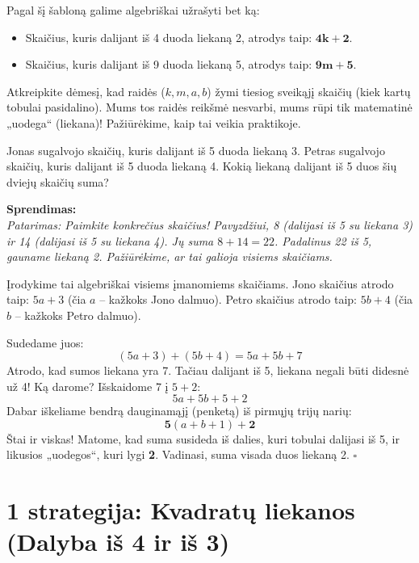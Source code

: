 \documentclass[11pt,a4paper]{scrartcl}
\newenvironment{solution}
    {\begin{list}{}{\setlength{\leftmargin}{10pt}\setlength{\rightmargin}{10pt}}\item[]}
    {\end{list}}
\begin{document}
Pagal šį šabloną galime algebriškai užrašyti bet ką:
\begin{itemize}
    \item Skaičius, kuris dalijant iš 4 duoda liekaną 2, atrodys taip: $\mathbf{4k + 2}$.
    \item Skaičius, kuris dalijant iš 9 duoda liekaną 5, atrodys taip: $\mathbf{9m + 5}$.
\end{itemize}
Atkreipkite dėmesį, kad raidės ($k, m, a, b$) žymi tiesiog sveikąjį skaičių (kiek kartų tobulai pasidalino). Mums tos raidės reikšmė nesvarbi, mums rūpi tik matematinė „uodega“ (liekana)! Pažiūrėkime, kaip tai veikia praktikoje.

\begin{example}
Jonas sugalvojo skaičių, kuris dalijant iš 5 duoda liekaną 3. Petras sugalvojo skaičių, kuris dalijant iš 5 duoda liekaną 4. Kokią liekaną dalijant iš 5 duos šių dviejų skaičių suma?
\end{example}

\begin{solution}
\textbf{Sprendimas:} \\
\textit{Patarimas: Paimkite konkrečius skaičius! Pavyzdžiui, 8 (dalijasi iš 5 su liekana 3) ir 14 (dalijasi iš 5 su liekana 4). Jų suma $8 + 14 = 22$. Padalinus 22 iš 5, gauname liekaną 2. Pažiūrėkime, ar tai galioja visiems skaičiams.}

Įrodykime tai algebriškai visiems įmanomiems skaičiams.
Jono skaičius atrodo taip: $5a + 3$ (čia $a$ – kažkoks Jono dalmuo).
Petro skaičius atrodo taip: $5b + 4$ (čia $b$ – kažkoks Petro dalmuo).

Sudedame juos:
\[ (5a + 3) + (5b + 4) = 5a + 5b + 7 \]
Atrodo, kad sumos liekana yra 7. Tačiau dalijant iš 5, liekana negali būti didesnė už 4! Ką darome? Išskaidome 7 į $5 + 2$:
\[ 5a + 5b + 5 + 2 \]
Dabar iškeliame bendrą dauginamąjį (penketą) iš pirmųjų trijų narių:
\[ \mathbf{5}(a + b + 1) + \mathbf{2} \]
Štai ir viskas! Matome, kad suma susideda iš dalies, kuri tobulai dalijasi iš 5, ir likusios „uodegos“, kuri lygi \textbf{2}. Vadinasi, suma visada duos liekaną 2. \hfill $\square$
\end{solution}

\section{1 strategija: Kvadratų liekanos (Dalyba iš 4 ir iš 3)}
\end{document}
